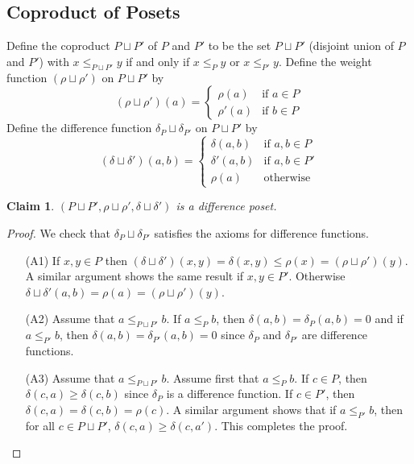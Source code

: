 \documentclass[acmsmall,review,anonymous]{acmart}\settopmatter{printfolios=true,printccs=false,printacmref=false}
\newtheorem{claim}{Claim}
\begin{document}
\subsection{Coproduct of Posets}
Define the coproduct $P \sqcup P'$ of $P$ and $P'$ to be the set $P \sqcup P'$
(disjoint union of $P$ and $P'$) with $x \leq_{P \sqcup P'} y$ if and only if
$x \leq_P y$ or $x \leq_{P'} y$. Define the weight function
$(\rho \sqcup \rho')$ on $P \sqcup P'$ by
$$(\rho \sqcup \rho')(a) =
\begin{cases}
\rho(a) &\text{if }a \in P\\
\rho'(a) &\text{if }b \in P
\end{cases}$$
Define the difference function $\delta_P \sqcup \delta_{P'}$ on $P \sqcup P'$ by
$$(\delta \sqcup \delta')(a, b) =
\begin{cases}
\delta(a, b) &\text{if }a, b \in P\\
\delta'(a, b) &\text{if }a, b \in P'\\
\rho(a) & \text{otherwise}
\end{cases}$$
\begin{claim}\label{coproductdifference}
$(P \sqcup P', \rho \sqcup \rho', \delta \sqcup \delta')$ is a difference poset.
\end{claim}
\begin{proof}
We check that $\delta_P \sqcup \delta_{P'}$ satisfies the axioms for difference
functions.
\begin{enumerate}
  \item[(A1)]
  If $x, y \in P$ then $(\delta \sqcup \delta')(x, y) = \delta(x, y) \leq
  \rho(x) = (\rho \sqcup \rho')(y)$. A similar argument shows the same result if
  $x, y \in P'$. Otherwise $\delta \sqcup \delta'(a, b) = \rho(a) = (\rho \sqcup
  \rho')(y)$.
  \item[(A2)]
  Assume that $a \leq_{P \sqcup P'} b$. If $a \leq_P b$, then $\delta(a, b) =
  \delta_P(a, b) = 0$ and if $a \leq_{P'} b$, then $\delta(a, b) =
  \delta_{P'}(a, b) = 0$ since $\delta_P$ and $\delta_{P'}$ are difference
  functions.
  \item[(A3)]
  Assume that $a \leq_{P \sqcup P'} b$. Assume first that $a \leq_P b$. If $c
  \in P$, then $\delta(c, a) \geq \delta(c, b)$ since $\delta_P$ is a
  difference function. If $c \in P'$, then $\delta(c, a) = \delta(c, b) =
  \rho(c)$. A similar argument shows that if $a \leq_{P'} b$, then for all $c
  \in P \sqcup P'$, $\delta(c, a) \geq \delta(c, a')$. This completes the
  proof.
\end{enumerate}
\end{proof}
\end{document}
